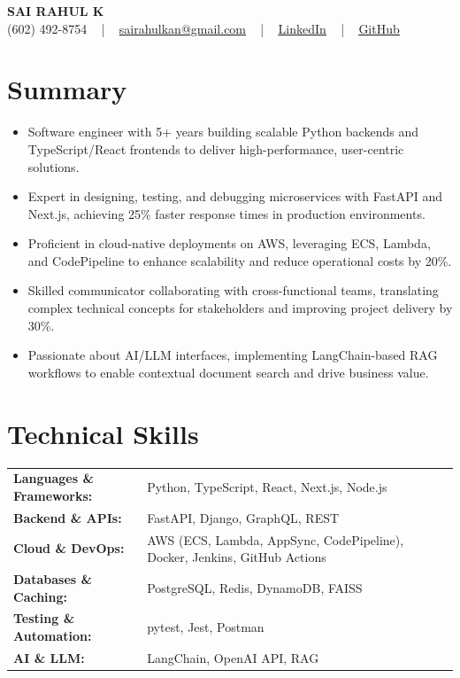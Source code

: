 \documentclass[letterpaper,11pt]{article}
\newcommand{\resumeItem}[1]{
  \item\footnotesize{
    {#1 \vspace{-2pt}}
  }
}
\newcommand{\resumeItemListStart}{\begin{itemize}[leftmargin=*]}
\newcommand{\resumeItemListEnd}{\end{itemize}\vspace{-5pt}}
\begin{document}
\begin{center}
    {\fontsize{14pt}{12pt}\selectfont \textbf{\MakeUppercase{Sai Rahul K}}}\\ \vspace{2pt}
    \fontsize{10pt}{12pt}\selectfont (602) 492-8754 ~ | ~ \href{mailto:sairahulkan@gmail.com}{sairahulkan@gmail.com} ~ | ~
    \href{https://www.linkedin.com/in/rq123/}{\color{blue}\underline{LinkedIn}} ~ | ~
    \href{https://github.com/kanrahuldo}{\color{blue}\underline{GitHub}}~
    \vspace{-8pt}
\end{center}

\section{Summary}
\fontsize{9pt}{10pt}\selectfont
\resumeItemListStart
    \resumeItem{Software engineer with 5+ years building scalable Python backends and TypeScript/React frontends to deliver high-performance, user-centric solutions.}
    \resumeItem{Expert in designing, testing, and debugging microservices with FastAPI and Next.js, achieving 25\% faster response times in production environments.}
    \resumeItem{Proficient in cloud-native deployments on AWS, leveraging ECS, Lambda, and CodePipeline to enhance scalability and reduce operational costs by 20\%.}
    \resumeItem{Skilled communicator collaborating with cross-functional teams, translating complex technical concepts for stakeholders and improving project delivery by 30\%.}
    \resumeItem{Passionate about AI/LLM interfaces, implementing LangChain-based RAG workflows to enable contextual document search and drive business value.}
\resumeItemListEnd
\vspace{-6pt}

\section{Technical Skills}
        \vspace{-14pt}
        \begin{table}[h]
            \fontsize{9pt}{10pt}\selectfont
            \begin{tabular}{p{0.3\linewidth} p{0.7\linewidth}}
                \textbf{Languages \& Frameworks:} & Python, TypeScript, React, Next.js, Node.js \\
                \textbf{Backend \& APIs:} & FastAPI, Django, GraphQL, REST \\
                \textbf{Cloud \& DevOps:} & AWS (ECS, Lambda, AppSync, CodePipeline), Docker, Jenkins, GitHub Actions \\
                \textbf{Databases \& Caching:} & PostgreSQL, Redis, DynamoDB, FAISS \\
                \textbf{Testing \& Automation:} & pytest, Jest, Postman \\
                \textbf{AI \& LLM:} & LangChain, OpenAI API, RAG \\
            \end{tabular}
        \end{table}
    \vspace{-15pt}
\end{document}
